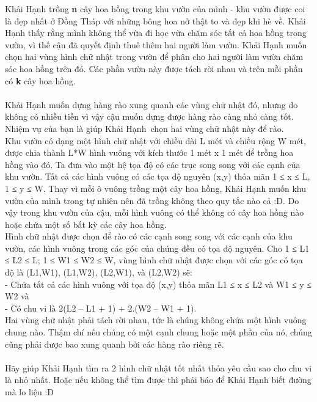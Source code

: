 Khải Hạnh trồng \textbf{ n } cây hoa hồng trong khu vườn của mình - khu vườn được coi là đẹp nhất ở Đồng Tháp với những bông hoa nở thật to và đẹp khi hè về. Khải Hạnh thấy rằng mình không thể vừa đi học vừa chăm sóc tất cả hoa hồng trong vườn, vì thế cậu đã quyết định thuê thêm hai người làm vườn. Khải Hạnh muốn chọn hai vùng hình chữ nhật trong vườn để phân cho hai người làm vườn chăm sóc hoa hồng trên đó. Các phần vườn này được tách rời nhau và trên mỗi phần có \textbf{ k } cây hoa hồng.
\\
\\Khải Hạnh muốn dựng hàng rào xung quanh các vùng chữ nhật đó, nhưng do không có nhiều tiền vì vậy cậu muốn dựng được hàng rào càng nhỏ càng tốt. Nhiệm vụ của bạn là giúp Khải Hạnh chọn hai vùng chữ nhật này để rào.
\\Khu vườn có dạng một hình chữ nhật với chiều dài L mét và chiều rộng W mét, được chia thành L*W hình vuông với kích thước 1 mét x 1 mét để trồng hoa hồng vào đó. Ta đưa vào một hệ tọa độ có các trục song song với các cạnh của khu vườn. Tất cả các hình vuông có các tọa độ nguyên (x,y) thỏa mãn 1 ≤ x ≤ L, 1 ≤ y ≤ W. Thay vì mỗi ô vuông trồng một cây hoa hồng, Khải Hạnh muốn khu vườn của mình trong tự nhiên nên đã trồng không theo quy tắc nào cả :D. Do vậy trong khu vườn của cậu, mỗi hình vuông có thể không có cây hoa hồng nào hoặc chứa một số bất kỳ các cây hoa hồng.
\\Hình chữ nhật được chọn để rào có các cạnh song song với các cạnh của khu vườn, các hình vuông trong các góc của chúng đều có tọa độ nguyên. Cho 1 ≤ L1 ≤ L2 ≤ L; 1 ≤ W1 ≤ W2 ≤ W, vùng hình chữ nhật được chọn với các góc có tọa độ là (L1,W1), (L1,W2), (L2,W1), và (L2,W2) sẽ:
\\- Chứa tất cả các hình vuông với tọa độ (x,y) thỏa mãn L1 ≤ x ≤ L2 và W1 ≤ y ≤ W2 và
\\- Có chu vi là 2(L2 – L1 + 1) + 2.(W2 – W1 + 1).
\\Hai vùng chữ nhật phải tách rời nhau, tức là chúng không chứa một hình vuông chung nào. Thậm chí nếu chúng có một cạnh chung hoặc một phần của nó, chúng cũng phải được bao xung quanh bởi các hàng rào riêng rẽ.
\\
\\Hãy giúp Khải Hạnh tìm ra 2 hình chữ nhật tốt nhất thỏa yêu cầu sao cho chu vi là nhỏ nhất. Hoặc nếu không thể tìm được thì phải báo để Khải Hạnh biết đường mà lo liệu :D

\